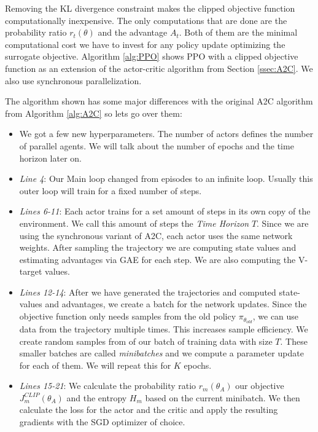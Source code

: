 Removing the KL divergence constraint makes the clipped objective function computationally inexpensive. The only computations that are done are the probability ratio $r_t(\theta)$ and the advantage $A_t$. Both of them are the minimal computational cost we have to invest for any policy update optimizing the surrogate objective. Algorithm \ref{alg:PPO} shows PPO with a clipped objective function as an extension of the actor-critic algorithm from Section \ref{ssec:A2C}. We also use synchronous parallelization.

 The algorithm shown has some major differences with the original A2C algorithm from Algorithm \ref{alg:A2C} so lets go over them:
\begin{itemize}
  \item We got a few new hyperparameters. The number of actors defines the number of parallel agents. We will talk about the number of epochs and the time horizon later on.
  \item \textit{Line 4}: Our Main loop changed from episodes to an infinite loop. Usually this outer loop will train for a fixed number of steps.
  \item \textit{Lines 6-11}: Each actor trains for a set amount of steps in its own copy of the environment. We call this amount of steps the \textit{Time Horizon} $T$. Since we are using the synchronous variant of A2C, each actor uses the same network weights. After sampling the trajectory we are computing state values and estimating advantages via GAE for each step. We are also computing the V-target values.
  \item \textit{Lines 12-14}: After we have generated the trajectories and computed state-values and advantages, we create a batch for the network updates. Since the objective function only needs samples from the old policy $\pi_{\theta_{old}}$, we can use data from the trajectory multiple times. This increases sample efficiency. We create random samples from of our batch of training data with size $T$. These smaller batches are called \textit{minibatches} and we compute a parameter update for each of them. We will repeat this for $K$ epochs.
  \item \textit{Lines 15-21}: We calculate the probability ratio $r_m(\theta_A)$ our objective $J^{CLIP}_m(\theta_A)$ and the entropy $H_m$ based on the current minibatch. We then calculate the loss for the actor and the critic and apply the resulting gradients with the SGD optimizer of choice. 
\end{itemize}


